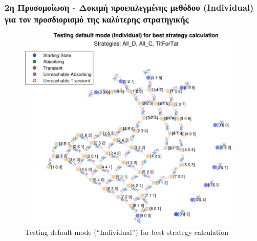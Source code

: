 \documentclass[12pt]{article}
\begin{document}
\subsubsection{2η Προσομοίωση - Δοκιμή προεπιλεγμένης μεθόδου (Individual) για τον προσδιορισμό της καλύτερης στρατηγικής}
	\begin{figure}[H]
	      \centering
	      \includegraphics[width=0.95\textwidth]{Testing default mode (Individual) for best strategy calculation.pdf}
	      \caption{Testing default mode (``Individual'') for best strategy calculation}
	\end{figure}
\end{document}
